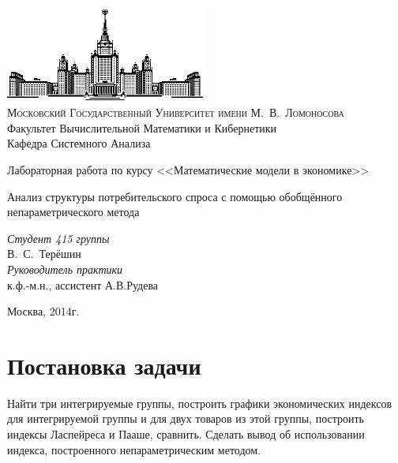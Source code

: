 \documentclass[12pt]{article}
\theoremstyle{rusdef}
\begin{document}
\thispagestyle{empty}

\begin{center}
\ \vspace{-3cm}

\includegraphics[width=0.5\textwidth]{msu.eps}\\

{\scshape Московский Государственный Университет имени М.~В.~Ломоносова}\\
Факультет Вычислительной Математики и Кибернетики\\
Кафедра Системного Анализа
\vfill

{\LARGE Лабораторная работа по курсу <<Математические модели в экономике>>}

{\LARGE Анализ структуры потребительского спроса с помощью обобщённого непараметрического метода}
\vspace{.5cm}

\end{center}

\vspace{1cm}

\begin{flushright}
\large
\textit{Студент 415 группы}\\
В.~С.~Терёшин\\
\vspace{5mm}
\textit{Руководитель практики}\\
к.ф.-м.н., ассистент А.В.Рудева

\end{flushright}

\vfill

\begin{center}
{\large
Москва, 2014г.}
\end{center}

\newpage
\tableofcontents
\newpage
\section{Постановка задачи}
Найти три интегрируемые группы, построить графики экономических индексов для интегрируемой группы и для двух товаров из этой группы, построить индексы Ласпейреса и Пааше, сравнить. Сделать вывод об использовании индекса, построенного непараметрическим методом.
\end{document}

